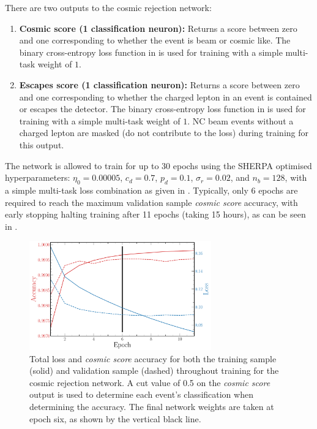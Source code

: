 There are two outputs to the cosmic rejection network:
\begin{enumerate}
    \item \textbf{Cosmic score (1 classification neuron):} Returns a score between zero and one
          corresponding to whether the event is beam or cosmic like. The binary cross-entropy loss
          function in  is used for training with a simple
          multi-task weight of $1$.
    \item \textbf{Escapes score (1 classification neuron):} Returns a score between zero and one
          corresponding to whether the charged lepton in an event is contained or escapes the
          detector. The binary cross-entropy loss function in
           is used for training with a simple multi-task
          weight of $1$. NC beam events without a charged lepton are masked (do not contribute to
          the loss) during training for this output.
\end{enumerate}

The network is allowed to train for up to 30 epochs using the SHERPA optimised hyperparameters:
$\eta_{0}=0.00005$, $c_{d}=0.7$, $p_{d}=0.1$, $\sigma_{r}=0.02$, and $n_{b}=128$, with a simple
multi-task loss combination as given in . Typically, only 6 epochs
are required to reach the maximum validation sample \emph{cosmic score} accuracy, with early
stopping halting training after 11 epochs (taking 15 hours), as can be seen in
.

\begin{figure} %
    \includegraphics[width=0.7\textwidth]{diagrams/7-results/final_cosmic_history.pdf}
    \caption[Loss and accuracy throughout training for the cosmic rejection network]
    {Total loss and \emph{cosmic score} accuracy for both the training sample (solid) and
        validation sample (dashed) throughout training for the cosmic rejection network. A cut
        value of 0.5 on the \emph{cosmic score} output is used to determine each event's
        classification when determining the accuracy. The final network weights are taken at epoch
        six, as shown by the vertical black line.}
    \label{fig:final_cosmic_history}
\end{figure}

